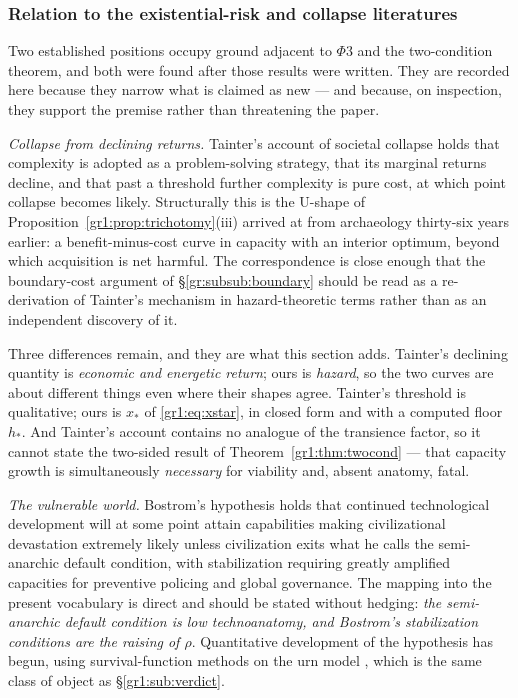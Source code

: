\documentclass[11pt]{article}
\numberwithin{equation}{section}
\theoremstyle{plain}
\theoremstyle{definition}
\theoremstyle{remark}
\begin{document}
\subsubsection{Relation to the existential-risk and collapse
literatures}\label{gr:subsub:xrisk}

Two established positions occupy ground adjacent to $\Phi3$ and the
two-condition theorem, and both were found after those results were
written. They are recorded here because they narrow what is claimed as
new --- and because, on inspection, they support the premise rather than
threatening the paper.

\emph{Collapse from declining returns.} Tainter's account of societal
collapse \cite{Tainter88} holds that complexity is adopted as a
problem-solving strategy, that its marginal returns decline, and that
past a threshold further complexity is pure cost, at which point
collapse becomes likely. Structurally this is the U-shape of
Proposition~\ref{gr1:prop:trichotomy}(iii) arrived at from archaeology
thirty-six years earlier: a benefit-minus-cost curve in capacity with an
interior optimum, beyond which acquisition is net harmful. The
correspondence is close enough that the boundary-cost argument of
\S\ref{gr:subsub:boundary} should be read as a re-derivation of
Tainter's mechanism in hazard-theoretic terms rather than as an
independent discovery of it.

Three differences remain, and they are what this section adds. Tainter's
declining quantity is \emph{economic and energetic return}; ours is
\emph{hazard}, so the two curves are about different things even where
their shapes agree. Tainter's threshold is qualitative; ours is
$x_\ast$ of \eqref{gr1:eq:xstar}, in closed form and with a computed
floor $h_\ast$. And Tainter's account contains no analogue of the
transience factor, so it cannot state the two-sided result of
Theorem~\ref{gr1:thm:twocond} --- that capacity growth is simultaneously
\emph{necessary} for viability and, absent anatomy, fatal.

\emph{The vulnerable world.} Bostrom's hypothesis \cite{Bostrom19} holds
that continued technological development will at some point attain
capabilities making civilizational devastation extremely likely unless
civilization exits what he calls the semi-anarchic default condition,
with stabilization requiring greatly amplified capacities for preventive
policing and global governance. The mapping into the present vocabulary
is direct and should be stated without hedging: \emph{the semi-anarchic
default condition is low technoanatomy, and Bostrom's stabilization
conditions are the raising of $\rho$}. Quantitative development of the
hypothesis has begun, using survival-function methods on the urn model
\cite{EF24}, which is the same class of object as
\S\ref{gr1:sub:verdict}.
\end{document}
